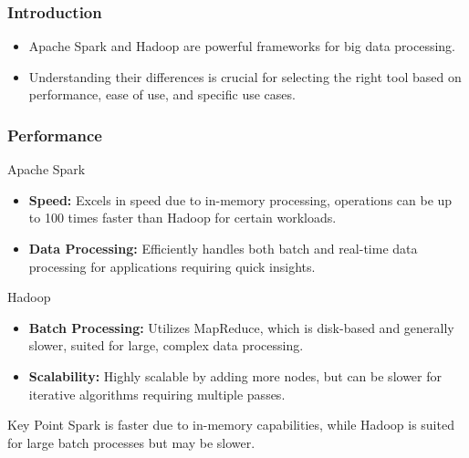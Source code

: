 \documentclass{beamer}
\begin{document}
\begin{frame}[fragile]
    \frametitle{Introduction}
    \begin{itemize}
        \item Apache Spark and Hadoop are powerful frameworks for big data processing.
        \item Understanding their differences is crucial for selecting the right tool based on performance, ease of use, and specific use cases.
    \end{itemize}
\end{frame}

\begin{frame}[fragile]
    \frametitle{Performance}
    \begin{block}{Apache Spark}
        \begin{itemize}
            \item \textbf{Speed:} Excels in speed due to in-memory processing, operations can be up to 100 times faster than Hadoop for certain workloads.
            \item \textbf{Data Processing:} Efficiently handles both batch and real-time data processing for applications requiring quick insights.
        \end{itemize}
    \end{block}
    
    \begin{block}{Hadoop}
        \begin{itemize}
            \item \textbf{Batch Processing:} Utilizes MapReduce, which is disk-based and generally slower, suited for large, complex data processing.
            \item \textbf{Scalability:} Highly scalable by adding more nodes, but can be slower for iterative algorithms requiring multiple passes.
        \end{itemize}
    \end{block}
    
    \begin{block}{Key Point}
        Spark is faster due to in-memory capabilities, while Hadoop is suited for large batch processes but may be slower.
    \end{block}
\end{frame}
\end{document}
